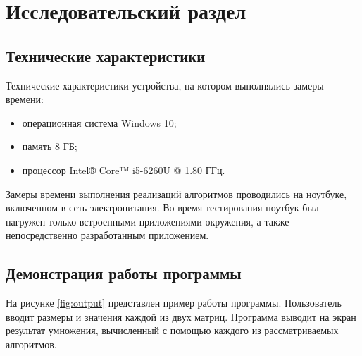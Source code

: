 \section{Исследовательский раздел \hfill}
\vspace{\baselineskip}


\subsection{Технические характеристики}

Технические характеристики устройства, на котором выполнялись замеры времени:

\begin{itemize}[label=---]
	\item операционная система Windows 10;
	\item память 8 ГБ;
	\item процессор Intel® Core™ i5-6260U @ 1.80 ГГц.
\end{itemize}

Замеры времени выполнения реализаций алгоритмов проводились на ноутбуке, включенном в сеть электропитания. Во время тестирования ноутбук был нагружен только встроенными приложениями окружения, а также непосредственно разработанным приложением.

\subsection{Демонстрация работы программы}

На рисунке \ref{fig:output} представлен пример работы программы. Пользователь вводит размеры и значения каждой из двух матриц. Программа выводит на экран результат умножения, вычисленный с помощью каждого из рассматриваемых алгоритмов.
\clearpage

